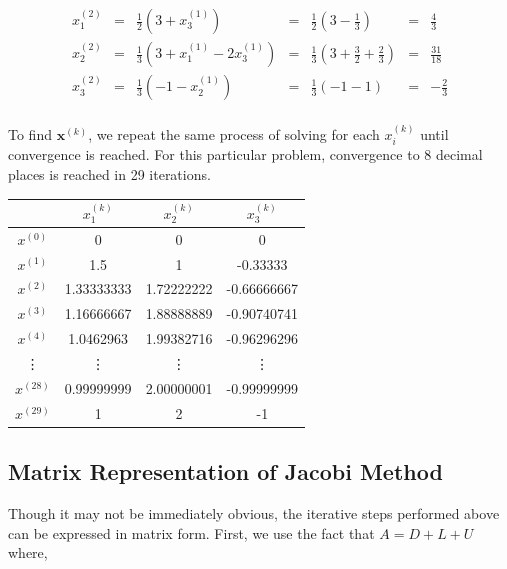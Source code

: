 $$
\begin{matrix}
x^{(2)}_1 & = & \frac{1}{2} ( 3 + x^{(1)}_3)  & = & \frac{1}{2} (3 - \frac{1}{3})     & = & \frac{4}{3} \\
x^{(2)}_2 & = & \frac{1}{3} ( 3 + x^{(1)}_1 - 2x^{(1)}_3) & = & \frac{1}{3} (3 + \frac{3}{2} + \frac{2}{3}) & = &  \frac{31}{18} \\
x^{(2)}_3 & = & \frac{1}{3} ( -1 - x^{(1)}_2)       & = & \frac{1}{3} (-1 - 1)    & = & -\frac{2}{3} \\
\end{matrix}
$$

To find $\mathbf{x}^{(k)}$, we repeat the same process of solving for each
$x^{(k)}_i$ until convergence is reached. For this particular problem,
convergence to 8 decimal places is reached in 29 iterations.

\begin{center}
\begin{tabular}{ c|c c c  }
          & $x^{(k)}_1$ & $x^{(k)}_2$ & $x^{(k)}_3$ \\
    \hline
    $x^{(0)}$ & 0 & 0 & 0 \\
    $x^{(1)}$ & 1.5 & 1 & -0.33333 \\
    $x^{(2)}$ & 1.33333333 & 1.72222222 & -0.66666667 \\
    $x^{(3)}$ & 1.16666667 & 1.88888889 & -0.90740741 \\
    $x^{(4)}$ & 1.0462963 & 1.99382716 & -0.96296296 \\
    \vdots    & \vdots    & \vdots     & \vdots     \\
    $x^{(28)}$ & 0.99999999 & 2.00000001 & -0.99999999 \\
    $x^{(29)}$ & 1 & 2 & -1 \\
\end{tabular}
\end{center}


\subsection*{Matrix Representation of Jacobi Method}
Though it may not be immediately obvious, the iterative steps performed above
can be expressed in matrix form. First, we use the fact that
$A = D + L + U$ where,

